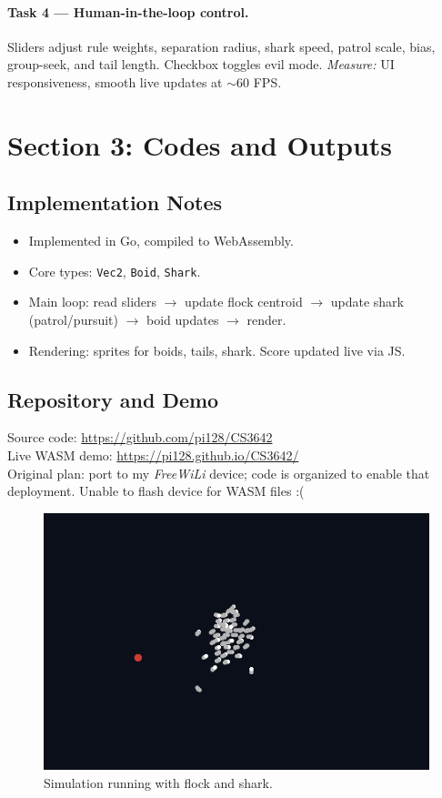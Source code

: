 \documentclass[11pt]{article}
\begin{document}
\paragraph{Task 4 — Human-in-the-loop control.}
Sliders adjust rule weights, separation radius, shark speed, patrol scale, bias, group-seek, and tail length. Checkbox toggles evil mode.  
\emph{Measure:} UI responsiveness, smooth live updates at $\sim$60 FPS.

\section*{Section 3: Codes and Outputs}

\subsection*{Implementation Notes}
\begin{itemize}[leftmargin=1.25em]
  \item Implemented in Go, compiled to WebAssembly.
  \item Core types: \texttt{Vec2}, \texttt{Boid}, \texttt{Shark}.
  \item Main loop: read sliders $\rightarrow$ update flock centroid $\rightarrow$ update shark (patrol/pursuit) $\rightarrow$ boid updates $\rightarrow$ render.
  \item Rendering: sprites for boids, tails, shark. Score updated live via JS.
\end{itemize}

\subsection*{Repository and Demo}
Source code: \url{https://github.com/pi128/CS3642} \\
Live WASM demo: \url{https://pi128.github.io/CS3642/} \\
Original plan: port to my \emph{FreeWiLi} device; code is organized to enable that deployment. Unable to flash device for WASM files :(


\begin{figure}[h]
  \centering
  
 
  \includegraphics[width=0.8\linewidth]{fish.png}
  \caption{Simulation running with flock and shark.}
\end{figure}
\end{document}
